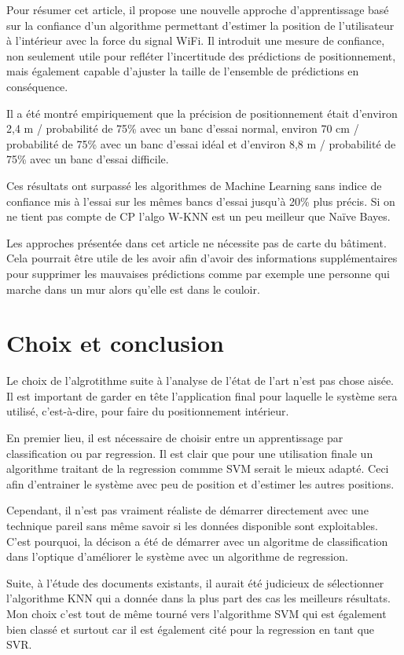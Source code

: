Pour résumer cet article, il propose une nouvelle approche d'apprentissage basé sur la confiance d'un algorithme permettant d'estimer la position de l'utilisateur à l'intérieur avec la force du signal WiFi. Il introduit une mesure de confiance, non seulement utile pour refléter l'incertitude des prédictions de positionnement, mais également capable d'ajuster la taille de l'ensemble de prédictions en conséquence. 

Il a été montré empiriquement que la précision de positionnement était d’environ 2,4 m / probabilité de 75\% avec un banc d’essai normal, environ 70 cm / probabilité de 75\% avec un banc d’essai idéal et d’environ 8,8 m / probabilité de 75\% avec un banc d’essai difficile. 

Ces résultats ont surpassé les algorithmes de Machine Learning sans indice de confiance mis à l'essai sur les mêmes bancs d'essai jusqu'à 20\% plus précis. Si on ne tient pas compte de CP l'algo W-KNN est un peu meilleur que Naïve Bayes. 

Les approches présentée dans cet article ne nécessite pas de carte du bâtiment. Cela pourrait être utile de les avoir afin d'avoir des informations supplémentaires pour supprimer les mauvaises prédictions comme par exemple une personne qui marche dans un mur alors qu'elle est dans le couloir.

\section{Choix et conclusion}
Le choix de l'algrotithme suite à l'analyse de l'état de l'art n'est pas chose aisée. Il est important de garder en tête l'application final pour laquelle le système sera utilisé, c'est-à-dire, pour faire du positionnement intérieur.

En premier lieu, il est nécessaire de choisir entre un apprentissage par classification ou par regression. Il est clair que pour une utilisation finale un algorithme traitant de la regression commme SVM serait le mieux adapté. Ceci afin d'entrainer le système avec peu de position et d'estimer les autres positions.

Cependant, il n'est pas vraiment réaliste de démarrer directement avec une technique pareil sans même savoir si les données disponible sont exploitables. C'est pourquoi, la décison a été de démarrer avec un algoritme de classification dans l'optique d'améliorer le système avec un algorithme de regression.

Suite, à l'étude des documents existants, il aurait été judicieux de sélectionner l'algorithme KNN qui a donnée dans la plus part des cas les meilleurs résultats. Mon choix c'est tout de même tourné vers l'algorithme SVM qui est également bien classé et surtout car il est également cité pour la regression en tant que SVR. 

